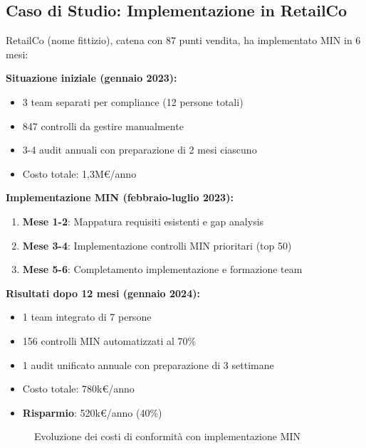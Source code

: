 \subsection{Caso di Studio: Implementazione in RetailCo}

RetailCo (nome fittizio), catena con 87 punti vendita, ha implementato MIN in 6 mesi:

\textbf{Situazione iniziale (gennaio 2023):}
\begin{itemize}
\item 3 team separati per compliance (12 persone totali)
\item 847 controlli da gestire manualmente
\item 3-4 audit annuali con preparazione di 2 mesi ciascuno
\item Costo totale: 1,3M€/anno
\end{itemize}

\textbf{Implementazione MIN (febbraio-luglio 2023):}
\begin{enumerate}
\item \textbf{Mese 1-2}: Mappatura requisiti esistenti e gap analysis
\item \textbf{Mese 3-4}: Implementazione controlli MIN prioritari (top 50)
\item \textbf{Mese 5-6}: Completamento implementazione e formazione team
\end{enumerate}

\textbf{Risultati dopo 12 mesi (gennaio 2024):}
\begin{itemize}
\item 1 team integrato di 7 persone
\item 156 controlli MIN automatizzati al 70\%
\item 1 audit unificato annuale con preparazione di 3 settimane
\item Costo totale: 780k€/anno
\item \textbf{Risparmio}: 520k€/anno (40\%)
\end{itemize}

\begin{figure}[h]
\centering
{}
\caption{Evoluzione dei costi di conformità con implementazione MIN}
\end{figure}


